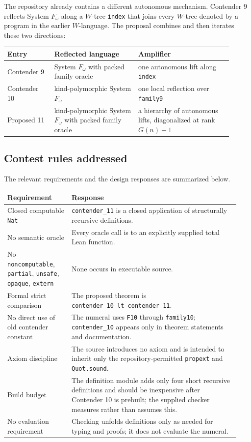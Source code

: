 \documentclass[11pt,oneside]{article}
\theoremstyle{definition}
\newcommand{\code}[1]{\texttt{#1}}
\begin{document}
The repository already contains a different autonomous mechanism.  Contender
9 reflects System $F_\omega$ along a $W$-tree \code{index} that joins every
$W$-tree denoted by a program in the earlier $W$-language.  The proposal
combines and then iterates these two directions:
\begin{center}
\begin{tabular}{@{}p{0.19\linewidth}p{0.34\linewidth}p{0.38\linewidth}@{}}
\toprule
Entry & Reflected language & Amplifier \\
\midrule
Contender 9 & System $F_\omega$ with packed family oracle & one autonomous lift along \code{index} \\
Contender 10 & kind-polymorphic System $F_\omega$ & one local reflection over \code{family9} \\
Proposed 11 & kind-polymorphic System $F_\omega$ with packed family oracle & a hierarchy of autonomous lifts, diagonalized at rank $G(n)+1$ \\
\bottomrule
\end{tabular}
\end{center}

\subsection{Contest rules addressed}

The relevant requirements and the design responses are summarized below.

\begin{longtable}{@{}p{0.26\linewidth}p{0.68\linewidth}@{}}
\toprule
Requirement & Response \\
\midrule
\endhead
Closed computable \code{Nat} & \code{contender\_11} is a closed application of structurally recursive definitions. \\
No semantic oracle & Every oracle call is to an explicitly supplied total Lean function. \\
No \code{noncomputable}, \code{partial}, \code{unsafe}, \code{opaque}, \code{extern} & None occurs in executable source. \\
Formal strict comparison & The proposed theorem is \code{contender\_10\_lt\_contender\_11}. \\
No direct use of old contender constant & The numeral uses \code{F10} through \code{family10}; \code{contender\_10} appears only in theorem statements and documentation. \\
Axiom discipline & The source introduces no axiom and is intended to inherit only the repository-permitted \code{propext} and \code{Quot.sound}. \\
Build budget & The definition module adds only four short recursive definitions and should be inexpensive after Contender 10 is prebuilt; the supplied checker measures rather than assumes this. \\
No evaluation requirement & Checking unfolds definitions only as needed for typing and proofs; it does not evaluate the numeral. \\
\bottomrule
\end{longtable}
\end{document}
